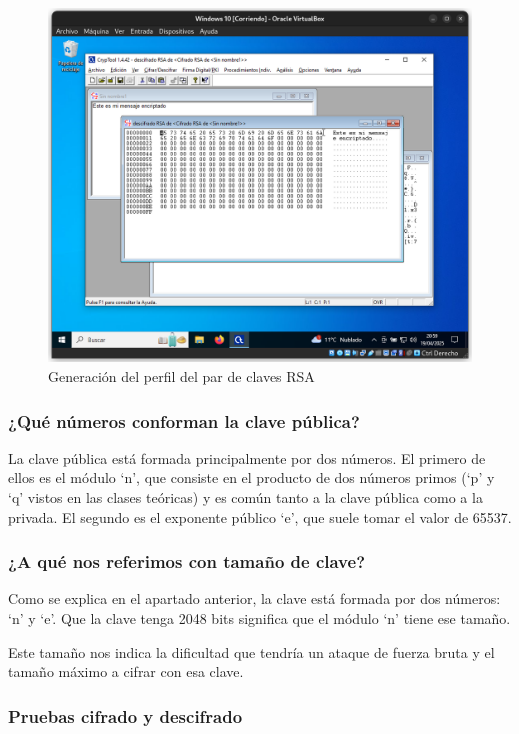 \begin{figure}[H]
    \includegraphics[width=\textwidth]{ClavesRSA-07.png}
    \caption{Generación del perfil del par de claves RSA}
\end{figure}


\subsubsection{¿Qué números conforman la clave pública?}

La clave pública está formada principalmente por dos números. El primero de ellos es el módulo ‘n’, que consiste en el producto de dos números primos (‘p’ y ‘q’ vistos en las clases teóricas) y es común tanto a la clave pública como a la privada. El segundo es el exponente público ‘e’, que suele tomar el valor de 65537. 

\subsubsection{¿A qué nos referimos con tamaño de clave?}

Como se explica en el apartado anterior, la clave está formada por dos números: ‘n’ y ‘e’. Que la clave tenga 2048 bits significa que el módulo ‘n’ tiene ese tamaño.  

Este tamaño nos indica la dificultad que tendría un ataque de fuerza bruta y el tamaño máximo a cifrar con esa clave. 


\subsubsection{Pruebas cifrado y descifrado}

